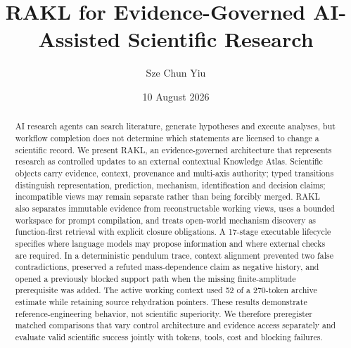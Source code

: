 \documentclass[11pt]{article}
\title{RAKL for Evidence-Governed AI-Assisted Scientific Research}
\author{Sze Chun Yiu}
\date{10 August 2026}
\newcommand{\RAKL}{\textsc{RAKL}}
\begin{document}
\maketitle

\begin{abstract}
AI research agents can search literature, generate hypotheses and execute analyses, but workflow completion does not determine which statements are licensed to change a scientific record. We present \RAKL{}, an evidence-governed architecture that represents research as controlled updates to an external contextual Knowledge Atlas. Scientific objects carry evidence, context, provenance and multi-axis authority; typed transitions distinguish representation, prediction, mechanism, identification and decision claims; incompatible views may remain separate rather than being forcibly merged. \RAKL{} also separates immutable evidence from reconstructable working views, uses a bounded workspace for prompt compilation, and treats open-world mechanism discovery as function-first retrieval with explicit closure obligations. A 17-stage executable lifecycle specifies where language models may propose information and where external checks are required. In a deterministic pendulum trace, context alignment prevented two false contradictions, preserved a refuted mass-dependence claim as negative history, and opened a previously blocked support path when the missing finite-amplitude prerequisite was added. The active working context used 52 of a 270-token archive estimate while retaining source rehydration pointers. These results demonstrate reference-engineering behavior, not scientific superiority. We therefore preregister matched comparisons that vary control architecture and evidence access separately and evaluate valid scientific success jointly with tokens, tools, cost and blocking failures.
\end{abstract}























\end{document}
